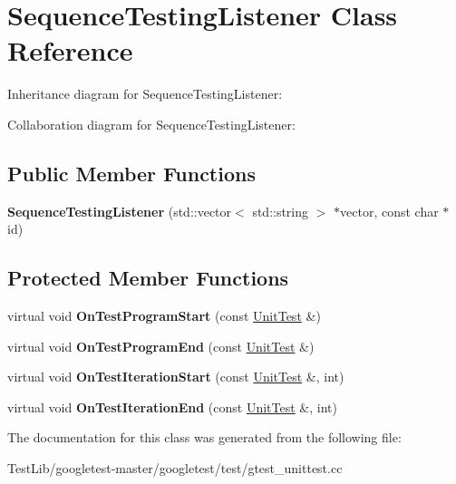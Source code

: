 \hypertarget{classSequenceTestingListener}{}\section{Sequence\+Testing\+Listener Class Reference}
\label{classSequenceTestingListener}


Inheritance diagram for Sequence\+Testing\+Listener\+:


Collaboration diagram for Sequence\+Testing\+Listener\+:
\subsection*{Public Member Functions}
\begin{DoxyCompactItemize}
\item 
\mbox{\label{classSequenceTestingListener_ac0fcb350d20876f8273621ad4c79ba7a}} 
{\bfseries Sequence\+Testing\+Listener} (std\+::vector$<$ std\+::string $>$ $\ast$vector, const char $\ast$id)
\end{DoxyCompactItemize}
\subsection*{Protected Member Functions}
\begin{DoxyCompactItemize}
\item 
\mbox{\label{classSequenceTestingListener_a25b96acdbaa6f582e583e6b56bd39b42}} 
virtual void {\bfseries On\+Test\+Program\+Start} (const \hyperlink{classtesting_1_1UnitTest}{Unit\+Test} \&)
\item 
\mbox{\label{classSequenceTestingListener_aacac5e15bac089460841ff63a5c31f57}} 
virtual void {\bfseries On\+Test\+Program\+End} (const \hyperlink{classtesting_1_1UnitTest}{Unit\+Test} \&)
\item 
\mbox{\label{classSequenceTestingListener_a345641262fa10cc4b251ac54116db74b}} 
virtual void {\bfseries On\+Test\+Iteration\+Start} (const \hyperlink{classtesting_1_1UnitTest}{Unit\+Test} \&, int)
\item 
\mbox{\label{classSequenceTestingListener_a783bc01e2a95f5bf73bbde4d96832e0f}} 
virtual void {\bfseries On\+Test\+Iteration\+End} (const \hyperlink{classtesting_1_1UnitTest}{Unit\+Test} \&, int)
\end{DoxyCompactItemize}


The documentation for this class was generated from the following file\+:\begin{DoxyCompactItemize}
\item 
Test\+Lib/googletest-\/master/googletest/test/gtest\+\_\+unittest.\+cc\end{DoxyCompactItemize}

